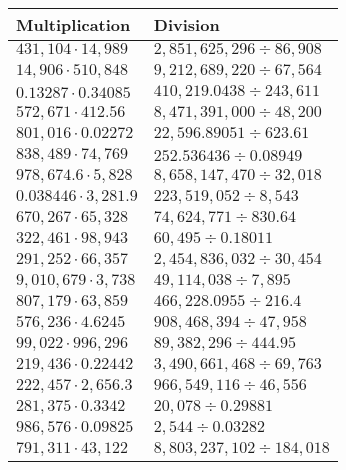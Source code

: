 \begin{longtable}[]{@{}ll@{}}
\toprule
Multiplication & Division\tabularnewline
\midrule
\endhead
\(431,104\cdot14,989\) & \(2,851,625,296÷86,908\)\tabularnewline
\(14,906\cdot510,848\) & \(9,212,689,220 ÷67,564\)\tabularnewline
\(0.13287\cdot0.34085\) & \(410,219.0438÷243,611\)\tabularnewline
\(572,671\cdot412.56\) & \(8,471,391,000÷48,200\)\tabularnewline
\(801,016\cdot0.02272\) & \(22,596.89051÷623.61\)\tabularnewline
\(838,489\cdot74,769\) & \(252.536436÷0.08949\)\tabularnewline
\(978,674.6\cdot5,828\) & \(8,658,147,470÷32,018\)\tabularnewline
\(0.038446\cdot3,281.9\) & \(223,519,052÷8,543\)\tabularnewline
\(670,267\cdot65,328\) & \(74,624,771÷830.64\)\tabularnewline
\(322,461\cdot98,943\) & \(60,495÷0.18011\)\tabularnewline
\(291,252\cdot66,357\) & \(2,454,836,032÷30,454\)\tabularnewline
\(9,010,679\cdot3,738\) & \(49,114,038÷7,895\)\tabularnewline
\(807,179\cdot63,859\) & \(466,228.0955÷216.4\)\tabularnewline
\(576,236\cdot4.6245\) & \(908,468,394÷47,958\)\tabularnewline
\(99,022\cdot996,296\) & \(89,382,296÷444.95\)\tabularnewline
\(219,436\cdot0.22442\) & \(3,490,661,468÷69,763\)\tabularnewline
\(222,457\cdot2,656.3\) & \(966,549,116÷46,556\)\tabularnewline
\(281,375\cdot0.3342\) & \(20,078÷0.29881\)\tabularnewline
\(986,576\cdot0.09825\) & \(2,544÷0.03282\)\tabularnewline
\(791,311\cdot43,122\) & \(8,803,237,102÷184,018\)\tabularnewline
\bottomrule
\end{longtable}
